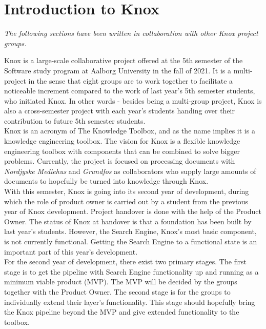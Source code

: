 \chapter{Introduction to Knox}\label{introduction_to_knox}
\textit{The following sections have been written in collaboration with other Knox project groups.}

Knox is a large-scale collaborative project offered at the 5th semester of the Software study program at Aalborg University in the fall of 2021. It is a multi-project in the sense that eight groups are to work together to facilitate a noticeable increment compared to the work of last year's 5th semester students, who initiated Knox. In other words - besides being a multi-group project, Knox is also a cross-semester project with each year's students handing over their contribution to future 5th semester students.\\

Knox is an acronym of The Knowledge Toolbox, and as the name implies it is a knowledge engineering toolbox. The vision for Knox is a flexible knowledge engineering toolbox with components that can be combined to solve bigger problems. Currently, the project is focused on processing documents with \textit{Nordjyske Mediehus} and \textit{Grundfos} as collaborators who supply large amounts of documents to hopefully be turned into knowledge through Knox.\\

With this semester, Knox is going into its second year of development, during which the role of product owner is carried out by a student from the previous year of Knox development. Project handover is done with the help of the Product Owner. The status of Knox at handover is that a foundation has been built by last year's students.
However, the Search Engine, Knox's most basic component, is not currently functional. Getting the Search Engine to a functional state is an important part of this year's development.\\

For the second year of development, there exist two primary stages.
The first stage is to get the pipeline with Search Engine functionality up and running as a minimum viable product (MVP). The MVP will be decided by the groups together with the Product Owner. The second stage is for the groups to individually extend their layer's functionality. This stage should hopefully bring the Knox pipeline beyond the MVP and give extended functionality to the toolbox.\\

